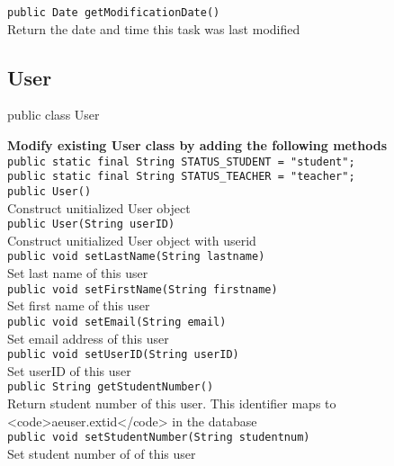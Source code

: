 {\tt 		public Date getModificationDate()} \\
Return the date and time this task was last modified\\





\subsection{User}
public class User 

{\bf Modify existing User class by adding the following methods}\\

{\tt		public static final String STATUS\_STUDENT = "student";} \\ 
{\tt		public static final String STATUS\_TEACHER = "teacher";} \\ 
	
{\tt		public User()} \\ 
Construct unitialized User object\\
	
{\tt		public User(String userID)} \\ 
Construct unitialized User object with userid\\
	
{\tt		public void setLastName(String lastname)} \\ 
Set last name of this user\\
	
{\tt		public void setFirstName(String firstname)} \\ 
Set first name of this user\\
	
{\tt		public void setEmail(String email)} \\ 
Set email address of this user\\

{\tt		public void setUserID(String userID)} \\ 
Set userID of this user\\

{\tt		public String getStudentNumber()} \\ 
Return student number of this user. This identifier maps to <code>aeuser.extid</code> in the database\\
	
{\tt		public void setStudentNumber(String studentnum)} \\ 
Set student number of of this user\\
	
